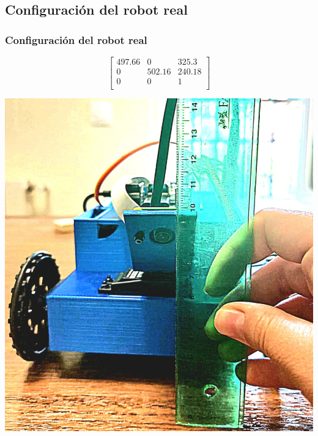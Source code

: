 \documentclass{beamer}
\begin{document}
\subsection{Configuración del robot real}

\begin{frame}
	\frametitle{Configuración del robot real}
	
	\centering
	\begin{minipage}{0.35\textwidth}
		\centering
		\begin{equation*}
			\begin{bmatrix}
				497.66 & 0 & 325.3 \\
				0 & 502.16 & 240.18 \\
				0 & 0 & 1 \\
			\end{bmatrix}
		\end{equation*}
	\end{minipage}
	\hspace{0.5cm} %
	\begin{minipage}{0.2\textwidth}
		\centering
		\includegraphics[width=\textwidth]{figs/traslacion.jpeg}

\end{minipage}
\end{frame}
\end{document}
